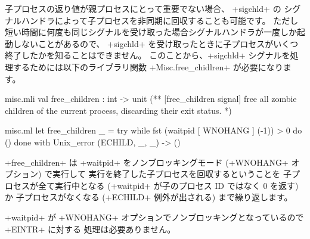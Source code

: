 \begin{example}\label{ex/childs}
子プロセスの返り値が親プロセスにとって重要でない場合、 \ml+sigchld+ の
シグナルハンドラによって子プロセスを非同期に回収することも可能です。
ただし短い時間に何度も同じシグナルを受け取った場合シグナルハンドラが一度しか起動しないことがあるので、
\ml+sigchld+ を受け取ったときに子プロセスがいくつ終了したかを知ることはできません。
このことから、\ml+sigchld+ シグナルを処理するためには以下のライブラリ関数 \ml+Misc.free_chidlren+ が必要になります。
%
\begin{codefile}{misc.mli}
val free_children : int -> unit
(** [free_children signal] free all zombie children of the current process,
    discarding their exit status. *)
\end{codefile}
%
\begin{listingcodefile}{misc.ml}
let free_children _ =
  try while fst (waitpid [ WNOHANG ] (-1)) > 0 do () done
  with Unix_error (ECHILD, _, _) -> ()
\end{listingcodefile}
%
\ml+free_children+ は \ml+waitpid+ をノンブロッキングモード (\ml+WNOHANG+ オプション) で実行して
実行を終了した子プロセスを回収するということを
子プロセスが全て実行中となる (\ml+waitpid+ が子のプロセス ID ではなく 0 を返す) か
子プロセスがなくなる (\ml+ECHILD+ 例外が出される) まで繰り返します。

\ml+waitpid+ が \ml+WNOHANG+ オプションでノンブロッキングとなっているので \ml+EINTR+ に対する
処理は必要ありません。
\end{example}

